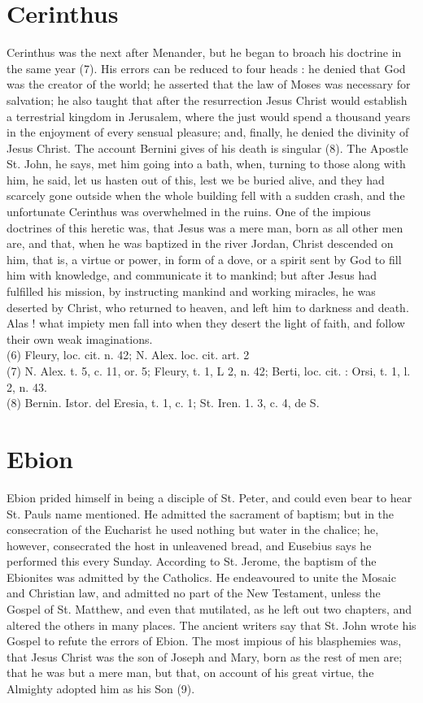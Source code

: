 \documentclass[12pt]{book}
\begin{document}
\section{Cerinthus}
Cerinthus was the next after Menander, but he began to broach his doctrine in the same year (7). His
errors can be reduced to four heads : he denied that God was the creator of the world; he asserted that the
law of Moses was necessary for salvation; he also taught that after the resurrection Jesus Christ would
establish a terrestrial kingdom in Jerusalem, where the just would spend a thousand years in the
enjoyment of every sensual pleasure; and, finally, he denied the divinity of Jesus Christ. The account
Bernini gives of his death is singular (8). The Apostle St. John, he says, met him going into a bath, when,
turning to those along with him, he said, let us hasten out of this, lest we be buried alive, and they had
scarcely gone outside when the whole building fell with a sudden crash, and the unfortunate Cerinthus
was overwhelmed in the ruins. One of the impious doctrines of this heretic was, that Jesus was a mere
man, born as all other men are, and that, when he was baptized in the river Jordan, Christ descended on
him, that is, a virtue or power, in form of a dove, or a spirit sent by God to fill him with knowledge, and
communicate it to mankind; but after Jesus had fulfilled his mission, by instructing mankind and
working miracles, he was deserted by Christ, who returned to heaven, and left him to darkness and
death. Alas ! what impiety men fall into when they desert the light of faith, and follow their own weak
imaginations.\\
(6) Fleury, loc. cit. n. 42; N. Alex. loc. cit. art. 2\\
(7) N. Alex. t. 5, c. 11, or. 5; Fleury, t. 1, L 2, n. 42; Berti, loc. cit. : Orsi, t. 1, l. 2, n. 43.\\
(8) Bernin. Istor. del Eresia, t. 1, c. 1; St. Iren. 1. 3, c. 4, de S.\\

\section{Ebion}
Ebion prided himself in being a disciple of St. Peter, and could even bear to hear St. Pauls name
mentioned. He admitted the sacrament of baptism; but in the consecration of the Eucharist he used
nothing but water in the chalice; he, however, consecrated the host in unleavened bread, and Eusebius
says he performed this every Sunday. According to St. Jerome, the baptism of the Ebionites was admitted
by the Catholics. He endeavoured to unite the Mosaic and Christian law, and admitted no part of the 
New Testament, unless the Gospel of St. Matthew, and even that mutilated, as he left out two chapters,
and altered the others in many places. The ancient writers say that St. John wrote his Gospel to refute the
errors of Ebion. The most impious of his blasphemies was, that Jesus Christ was the son of Joseph and
Mary, born as the rest of men are; that he was but a mere man, but that, on account of his great virtue, the
Almighty adopted him as his Son (9).
\end{document}
